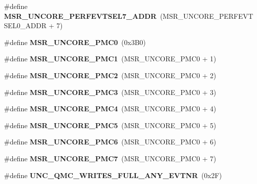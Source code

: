 \begin{DoxyCompactItemize}
\item 
\#define {\bfseries M\+S\+R\+\_\+\+U\+N\+C\+O\+R\+E\+\_\+\+P\+E\+R\+F\+E\+V\+T\+S\+E\+L7\+\_\+\+A\+D\+DR}~(M\+S\+R\+\_\+\+U\+N\+C\+O\+R\+E\+\_\+\+P\+E\+R\+F\+E\+V\+T\+S\+E\+L0\+\_\+\+A\+D\+DR + 7)\label{types_8h_aeda0600911ff4baeeaeeb3c36540a508}

\item 
\#define {\bfseries M\+S\+R\+\_\+\+U\+N\+C\+O\+R\+E\+\_\+\+P\+M\+C0}~(0x3\+B0)\label{types_8h_a592a3e5afd79812513acf908d7ae0d8a}

\item 
\#define {\bfseries M\+S\+R\+\_\+\+U\+N\+C\+O\+R\+E\+\_\+\+P\+M\+C1}~(M\+S\+R\+\_\+\+U\+N\+C\+O\+R\+E\+\_\+\+P\+M\+C0 + 1)\label{types_8h_a717e98a8854f396ed8babb52ed62b94c}

\item 
\#define {\bfseries M\+S\+R\+\_\+\+U\+N\+C\+O\+R\+E\+\_\+\+P\+M\+C2}~(M\+S\+R\+\_\+\+U\+N\+C\+O\+R\+E\+\_\+\+P\+M\+C0 + 2)\label{types_8h_aca5d029ab6db9be41c3c2f8b87dd2349}

\item 
\#define {\bfseries M\+S\+R\+\_\+\+U\+N\+C\+O\+R\+E\+\_\+\+P\+M\+C3}~(M\+S\+R\+\_\+\+U\+N\+C\+O\+R\+E\+\_\+\+P\+M\+C0 + 3)\label{types_8h_aa24f97a63a98e8c679d63337b7d1f189}

\item 
\#define {\bfseries M\+S\+R\+\_\+\+U\+N\+C\+O\+R\+E\+\_\+\+P\+M\+C4}~(M\+S\+R\+\_\+\+U\+N\+C\+O\+R\+E\+\_\+\+P\+M\+C0 + 4)\label{types_8h_aa8da504c3306853bbc38d19b192bd871}

\item 
\#define {\bfseries M\+S\+R\+\_\+\+U\+N\+C\+O\+R\+E\+\_\+\+P\+M\+C5}~(M\+S\+R\+\_\+\+U\+N\+C\+O\+R\+E\+\_\+\+P\+M\+C0 + 5)\label{types_8h_a0feaf89fcc2184adf2fdf25f7b91a4ef}

\item 
\#define {\bfseries M\+S\+R\+\_\+\+U\+N\+C\+O\+R\+E\+\_\+\+P\+M\+C6}~(M\+S\+R\+\_\+\+U\+N\+C\+O\+R\+E\+\_\+\+P\+M\+C0 + 6)\label{types_8h_ad6eb53ff302cbe4e49539f0dcd2732d4}

\item 
\#define {\bfseries M\+S\+R\+\_\+\+U\+N\+C\+O\+R\+E\+\_\+\+P\+M\+C7}~(M\+S\+R\+\_\+\+U\+N\+C\+O\+R\+E\+\_\+\+P\+M\+C0 + 7)\label{types_8h_a1c7b14ded17a8e1a216c908b5f6f84b7}

\item 
\#define {\bfseries U\+N\+C\+\_\+\+Q\+M\+C\+\_\+\+W\+R\+I\+T\+E\+S\+\_\+\+F\+U\+L\+L\+\_\+\+A\+N\+Y\+\_\+\+E\+V\+T\+NR}~(0x2\+F)\label{types_8h_a4f51d39c0b2c93cc8b109a94e6314118}


\end{DoxyCompactItemize}
